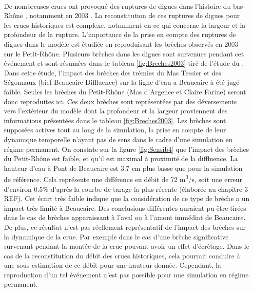 \documentclass[11pt]{article}
\begin{document}
	\paragraph{} De nombreuses crues ont provoqué des ruptures de digues dans l'histoire du bas-Rhône \citep{pichard_sept_2014}, notamment en 2003 \citep{medd_debit_2005}. La reconstitution de ces ruptures de digues pour les crues historiques est complexe, notamment en ce qui concerne la largeur et la profondeur de la rupture. L'importance de la prise en compte des ruptures de digues dans le modèle est étudiée en reproduisant les brèches observés en 2003 sur le Petit-Rhône. Plusieurs brèches dans les digues sont survenues pendant cet événement et sont résumées dans le tableau \ref{fig:Breches2003} tiré de l'étude du \citet{symadrem_programme_2012}. Dans cette étude, l'impact des brèches des trémies du Mas Tessier et des Ségonnaux (bief Beaucaire-Diffluence) sur la ligne d'eau a Beaucaire à été jugé faible. Seules les brèches du Petit-Rhône (Mas d'Argence et Claire Farine) seront donc reproduites ici. Ces deux brèches sont représentées par des déversements vers l'extérieur du modèle dont la profondeur et la largeur proviennent des informations présentées dans le tableau \ref{fig:Breches2003}. Les brèches sont supposées actives tout au long de la simulation, la prise en compte de leur dynamique temporelle n'ayant pas de sens dans le cadre d'une simulation en régime permanent. On constate sur la figure \ref{fig:Sensib4} que l'impact des brèches du Petit-Rhône est faible, et qu'il est maximal à proximité de la diffluence. La hauteur d'eau à Pont de Beaucaire est 3.7 cm plus basse que pour la simulation de référence. Cela représente une différence en débit de 72 m\textsuperscript{3}/s, soit une erreur d'environ 0.5\% d'après la courbe de tarage la plus récente (élaborée au chapitre 3 REF). Cet écart très faible indique que la considération de ce type de brèche a un impact très limité à Beaucaire. Des conclusions différentes auraient pu être tirées dans le cas de brèches apparaissant à l'aval ou à l'amont immédiat de Beaucaire. De plus, ce résultat n'est pas réellement représentatif de l'impact des brèches sur la dynamique de la crue. Par exemple dans le cas d'une brèche significative survenant pendant la montée de la crue pouvant avoir un effet d'écrêtage. Dans le cas de la reconstitution du débit des crues historiques, cela pourrait conduire à une sous-estimation de ce débit pour une hauteur donnée. Cependant, la reproduction d'un tel événement n'est pas possible pour une simulation en régime permanent.
	
\end{document}
